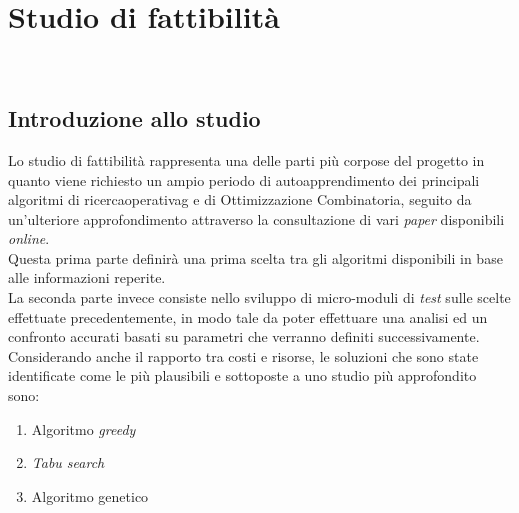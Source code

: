 
\chapter{Studio di fattibilità}
\label{cap:studio-fattibilita}

\noindent {}\\

\section{Introduzione allo studio}
\noindent Lo studio di fattibilità rappresenta una delle parti più corpose
del progetto in quanto viene richiesto un ampio periodo di autoapprendimento
dei principali algoritmi di \gls{ricercaoperativag} e di Ottimizzazione Combinatoria,
seguito da un'ulteriore approfondimento attraverso la consultazione di vari \textit{paper}
disponibili \textit{online}.\\

\noindent Questa prima parte definirà una prima scelta tra gli algoritmi disponibili in base alle informazioni reperite.\\

\noindent La seconda parte invece consiste nello sviluppo di micro-moduli di \textit{test} sulle scelte effettuate
precedentemente, in modo tale da poter effettuare una analisi ed un confronto accurati basati su parametri che verranno
definiti successivamente.\\

\noindent Considerando anche il rapporto tra costi e risorse, le soluzioni che sono state identificate come le più plausibili e sottoposte a uno studio più approfondito sono:
\begin{enumerate}
    \item Algoritmo \textit{greedy}
    \item \textit{Tabu search}
    \item Algoritmo genetico
\end{enumerate}

